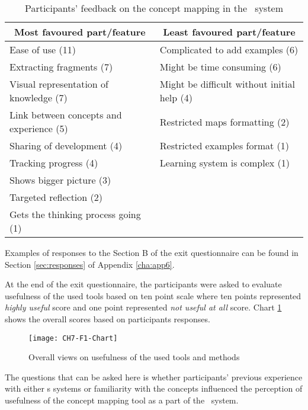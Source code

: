 \begin{table}[htb] \small
  \begin{center}
    \begin{tabular}{| p{6.5cm} | p{6.5cm} |}
    \hline
     \multicolumn{1}{|c|}{\textbf{Most favoured part/feature}} &
     \multicolumn{1}{c|}{\textbf{Least favoured part/feature}} \\
     \hline
     Ease of use (11) & Complicated to add examples (6) \\ \hline
     Extracting fragments (7) & Might be time consuming (6) \\ \hline
     Visual representation of knowledge (7) & Might be difficult without initial help (4) \\ \hline
     Link between concepts and experience (5) & Restricted maps formatting (2) \\ \hline 
     Sharing of development (4) & Restricted examples format (1) \\ \hline
     Tracking progress (4) & Learning system is complex (1) \\ \hline
     Shows bigger picture (3) &  \\ \hline
     Targeted reflection (2) & \\ \hline
     Gets the thinking process going (1) & \\ \hline
    \end{tabular}
  \end{center}
  \caption{Participants' feedback on the concept mapping in the \ep~system }
  \label{tab:study2summary}
\end{table}

Examples of responses to the Section B of the exit questionnaire can be found in
Section \ref{sec:responses} of Appendix \ref{cha:app6}.

At the end of the exit questionnaire, the participants were asked to evaluate
usefulness of the used tools based on ten point scale where ten points
represented \textit{highly useful} score and one point represented \textit{not
useful at all} score. Chart \ref{fig:overall} shows the overall scores based on
participants responses.

\begin{figure}[htb]
\centering
\texttt{[image: CH7-F1-Chart]}
\caption{Overall views on usefulness of the used tools and methods}
\label{fig:overall}
\end{figure}

The questions that can be asked here is whether participants' previous
experience with either \ep s systems or familiarity with the \LLLs concepts
influenced the perception of usefulness of the concept mapping tool as a part of
the \ep~system.

